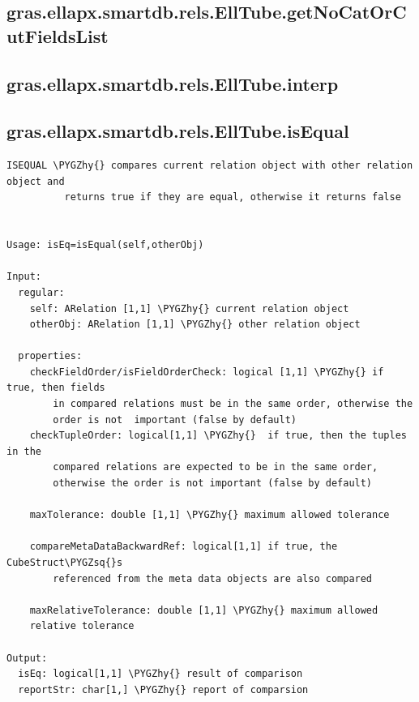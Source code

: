 \documentclass[letterpaper,10pt,english]{sphinxmanual}
\def\PYGZhy{\char`\-}
\def\PYGZsq{\char`\'}
\begin{document}
\subsection{gras.ellapx.smartdb.rels.EllTube.getNoCatOrCutFieldsList}
\label{chap_functions:gras-ellapx-smartdb-rels-elltube-getnocatorcutfieldslist}

\subsection{gras.ellapx.smartdb.rels.EllTube.interp}
\label{chap_functions:gras-ellapx-smartdb-rels-elltube-interp}

\subsection{gras.ellapx.smartdb.rels.EllTube.isEqual}
\label{chap_functions:gras-ellapx-smartdb-rels-elltube-isequal}
\begin{Verbatim}[commandchars=\\\{\}]
ISEQUAL \PYGZhy{} compares current relation object with other relation object and
          returns true if they are equal, otherwise it returns false


Usage: isEq=isEqual(self,otherObj)

Input:
  regular:
    self: ARelation [1,1] \PYGZhy{} current relation object
    otherObj: ARelation [1,1] \PYGZhy{} other relation object

  properties:
    checkFieldOrder/isFieldOrderCheck: logical [1,1] \PYGZhy{} if true, then fields
        in compared relations must be in the same order, otherwise the
        order is not  important (false by default)
    checkTupleOrder: logical[1,1] \PYGZhy{}  if true, then the tuples in the
        compared relations are expected to be in the same order,
        otherwise the order is not important (false by default)

    maxTolerance: double [1,1] \PYGZhy{} maximum allowed tolerance

    compareMetaDataBackwardRef: logical[1,1] if true, the CubeStruct\PYGZsq{}s
        referenced from the meta data objects are also compared

    maxRelativeTolerance: double [1,1] \PYGZhy{} maximum allowed
    relative tolerance

Output:
  isEq: logical[1,1] \PYGZhy{} result of comparison
  reportStr: char[1,] \PYGZhy{} report of comparsion
\end{Verbatim}
\end{document}
